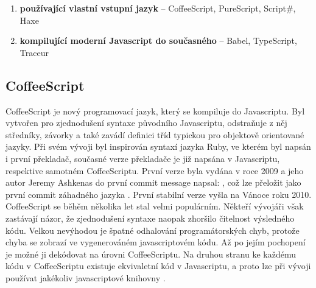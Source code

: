 \begin{enumerate}
\item \textbf{používající vlastní vstupní jazyk} – CoffeeScript, PureScript, Script\#, Haxe
\item \textbf{kompilující moderní Javascript do současného} – Babel, TypeScript, Traceur 
\end{enumerate}

\subsection{CoffeeScript}
CoffeeScript je nový programovací jazyk, který se kompiluje do Javascriptu. Byl vytvořen pro zjednodušení syntaxe původního Javascriptu, odstraňuje z něj středníky, závorky a také zavádí definici tříd typickou pro objektově orientované jazyky. Při svém vývoji byl inspirován syntaxí jazyka Ruby, ve kterém byl napsán i první překladač, současné verze překladače je již napsána v Javascriptu, respektive samotném CoffeeScriptu. První verze byla vydána v roce 2009 a jeho autor Jeremy Ashkenas do první commit message napsal: , což lze přeložit jako první commit záhadného jazyka \cite{coffeescript_founder}. První stabilní verze vyšla na Vánoce roku 2010. CoffeeScript se běhěm několika let stal velmi populárním. Někteří vývojáři však zastávají názor, že zjednodušení syntaxe naopak zhoršilo čitelnost výsledného kódu. Velkou nevýhodou je špatné odhalování programátorských chyb, protože chyba se zobrazí ve vygenerováném javascriptovém kódu. Až po jejím pochopení je možné ji dekódovat na úrovni CoffeeScriptu. Na druhou stranu ke každému kódu v CoffeeScriptu existuje ekvivaletní kód v Javascriptu, a proto lze při vývoji používat jakékoliv javascriptové knihovny \cite{coffeescript}.

